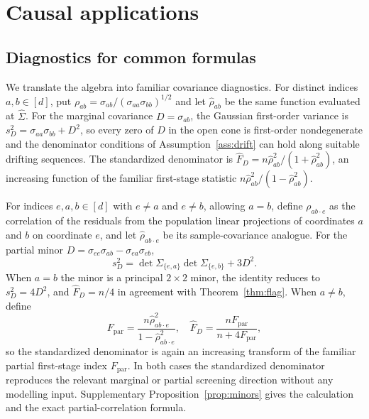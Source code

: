 \documentclass[12pt,a4paper]{article}
\theoremstyle{plain}
\theoremstyle{definition}
\newcommand{\Sighat}{\hat{\Sigma}}
\newcommand{\FD}{\widehat{F}_D}
\begin{document}
\section{Causal applications}
\label{sec:causal}

\subsection{Diagnostics for common formulas}

We translate the algebra into familiar covariance diagnostics.
For distinct indices $a,b\in[d]$, put $\rho_{ab}=\sigma_{ab}/(\sigma_{aa}\sigma_{bb})^{1/2}$ and let $\hat{\rho}_{ab}$ be the same function evaluated at $\Sighat$.
For the marginal covariance $D=\sigma_{ab}$, the Gaussian first-order variance is $s_D^2=\sigma_{aa}\sigma_{bb}+D^2$, so every zero of $D$ in the open cone is first-order nondegenerate and the denominator conditions of Assumption~\ref{ass:drift} can hold along suitable drifting sequences.
The standardized denominator is $\FD=n\hat{\rho}_{ab}^2/(1+\hat{\rho}_{ab}^2)$, an increasing function of the familiar first-stage statistic $n\hat{\rho}_{ab}^2/(1-\hat{\rho}_{ab}^2)$.

For indices $e,a,b\in[d]$ with $e\ne a$ and $e\ne b$, allowing $a=b$, define $\rho_{ab\cdot e}$ as the correlation of the residuals from the population linear projections of coordinates $a$ and $b$ on coordinate $e$, and let $\hat{\rho}_{ab\cdot e}$ be its sample-covariance analogue.
For the partial minor $D=\sigma_{ee}\sigma_{ab}-\sigma_{ea}\sigma_{eb}$,
\begin{equation}
\label{eq:partial-minor}
    s_D^2
    =
    \det\Sigma_{\{e,a\}}\det\Sigma_{\{e,b\}}+3D^2
    .
\end{equation}
When $a=b$ the minor is a principal $2\times 2$ minor, the identity reduces to $s_D^2=4D^2$, and $\FD=n/4$ in agreement with Theorem~\ref{thm:flag}.
When $a\ne b$, define
\begin{equation*}
    F_{\mathrm{par}}
    =
    \frac{n\hat{\rho}_{ab\cdot e}^{2}}
    {1-\hat{\rho}_{ab\cdot e}^{2}}
    ,\quad
    \FD
    =
    \frac{nF_{\mathrm{par}}}{n+4F_{\mathrm{par}}}
    ,
\end{equation*}
so the standardized denominator is again an increasing transform of the familiar partial first-stage index $F_{\mathrm{par}}$.
In both cases the standardized denominator reproduces the relevant marginal or partial screening direction without any modelling input.
Supplementary Proposition~\ref{prop:minors} gives the calculation and the exact partial-correlation formula.
\end{document}
